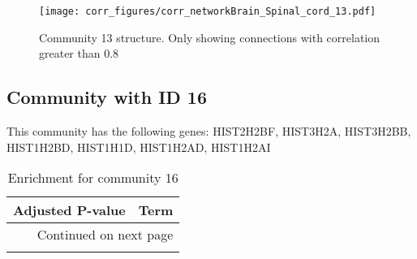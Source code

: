 \begin{figure}[h!]
\centering
\texttt{[image: corr\_figures/corr\_networkBrain\_Spinal\_cord\_13.pdf]}
\caption{Community 13 structure. Only showing connections with correlation greater than 0.8}
\end{figure}




\subsection*{Community with ID 16}
This community has the following genes: HIST2H2BF, HIST3H2A, HIST3H2BB, HIST1H2BD, HIST1H1D, HIST1H2AD, HIST1H2AI
\\
\begin{longtable}{p{2.4cm}p{14.5cm}}
\caption{Enrichment for community 16}\\
\toprule
Adjusted \newline P-value &                                                                                                                                  Term \\
\midrule
\endhead
\midrule
\multicolumn{2}{r}{{Continued on next page}} \\
\midrule
\endfoot


\end{longtable}
